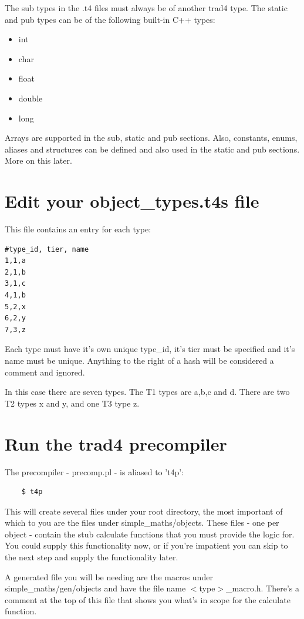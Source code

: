 \documentclass{report}
\begin{document}
The sub types in the .t4 files must always be of another trad4 type. The static and pub types can be of the following built-in C++ types:

\begin{itemize}
\item int
\item char
\item float
\item double
\item long
\end{itemize}

Arrays are supported in the sub, static and pub sections. Also, constants, enums, aliases and structures can be defined and also used in the static and pub sections. More on this later.

\section{Edit your object_types.t4s file}

This file contains an entry for each type:
\begin{verbatim}
#type_id, tier, name
1,1,a
2,1,b
3,1,c
4,1,b
5,2,x
6,2,y
7,3,z
\end{verbatim}

Each type must have it's own unique type_id, it's tier must be specified and it's name must be unique. 
Anything to the right of a hash will be considered a comment and ignored.

In this case there are seven types. The T1 types are a,b,c and d. There are two T2 types x and y, and one T3 type z.

\section{Run the trad4 precompiler}

The precompiler - precomp.pl - is aliased to 't4p':

\begin{verbatim}
    $ t4p
\end{verbatim}

This will create several files under your root directory, the most important of which to you are the files under simple_maths/objects. These files - one per object - contain the stub calculate functions that you must provide the logic for.  You could supply this functionality now, or if you're impatient you can skip to the next step and supply the functionality later.

A generated file you will be needing are the macros under simple_maths/gen/objects and have the file name $<$type$>$_macro.h. There's a comment at the top of this file that shows you what's in scope for the calculate function.
\end{document}
